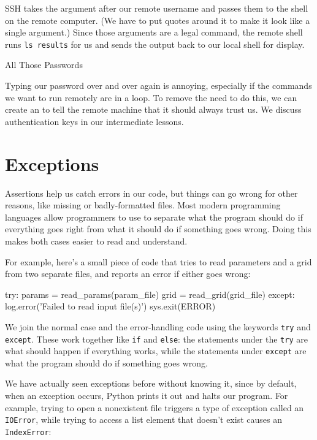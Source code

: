 \documentclass{book}
\begin{document}
SSH takes the argument after our remote username and passes them to the
shell on the remote computer. (We have to put quotes around it to make
it look like a single argument.) Since those arguments are a legal
command, the remote shell runs \texttt{ls results} for us and sends the
output back to our local shell for display.

\begin{swcbox}{All Those Passwords}

Typing our password over and over again is annoying, especially if the
commands we want to run remotely are in a loop. To remove the need to do
this, we can create an  to tell the remote machine that it should always trust us. We
discuss authentication keys in our intermediate lessons.

\end{swcbox}

\section{Exceptions}

Assertions help us catch errors in our code, but things can go wrong for
other reasons, like missing or badly-formatted files. Most modern
programming languages allow programmers to use
 to separate what the program should
do if everything goes right from what it should do if something goes
wrong. Doing this makes both cases easier to read and understand.

For example, here's a small piece of code that tries to read parameters
and a grid from two separate files, and reports an error if either goes
wrong:

\begin{VerbIn}
try:
    params = read_params(param_file)
    grid = read_grid(grid_file)
except:
    log.error('Failed to read input file(s)')
    sys.exit(ERROR)
\end{VerbIn}

We join the normal case and the error-handling code using the keywords
\texttt{try} and \texttt{except}. These work together like \texttt{if}
and \texttt{else}: the statements under the \texttt{try} are what should
happen if everything works, while the statements under \texttt{except}
are what the program should do if something goes wrong.

We have actually seen exceptions before without knowing it, since by
default, when an exception occurs, Python prints it out and halts our
program. For example, trying to open a nonexistent file triggers a type
of exception called an \texttt{IOError}, while trying to access a list
element that doesn't exist causes an \texttt{IndexError}:
\end{document}
